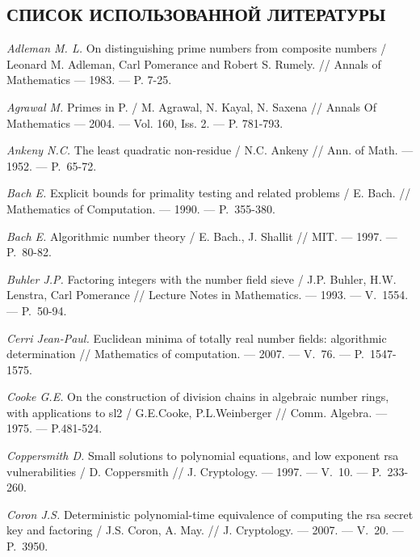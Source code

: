 \newpage
\begin{center}
    \section*{СПИСОК ИСПОЛЬЗОВАННОЙ ЛИТЕРАТУРЫ}
\end{center}

\begin{thebibliography}{99}
\vspace{-12pt}

    \textit{Adleman M. L.} On distinguishing prime numbers from composite numbers / Leonard M. Adleman, Carl Pomerance and Robert S. Rumely. // Annals of Mathematics — 1983. — P. 7-25.
    
    \textit{Agrawal M.} Primes in P. / M. Agrawal, N. Kayal, N. Saxena // Annals Of Mathematics — 2004. — Vol. 160, Iss. 2. — P. 781-793.
    
    \textit{Ankeny N.C.} The least quadratic non-residue / N.C. Ankeny // Ann. of Math. — 1952. — P.~65-72.

    \textit{Bach E.} Explicit bounds for primality testing and related problems / E. Bach. // Mathematics of Computation. — 1990. — P.~355-380.
    
    \textit{Bach E.} Algorithmic number theory / E. Bach., J. Shallit // MIT. — 1997. — P.~80-82.
    
    \textit{Buhler J.P.} Factoring integers with the number field sieve / J.P. Buhler, H.W. Lenstra, Carl Pomerance // Lecture Notes in Mathematics. — 1993. — V.~1554. — P.~50-94.

    \textit{Cerri Jean-Paul.} Euclidean minima of totally real number fields: algorithmic determination // Mathematics of computation. — 2007. — V.~76. — {P.}~1547-1575.

    \textit{Cooke G.E.} On the construction of division chains in algebraic number rings, with applications to sl2 / G.E.Cooke, P.L.Weinberger // Comm. Algebra. — 1975. — P.481-524.

    \textit{Coppersmith D.} Small solutions to polynomial equations, and low exponent rsa vulnerabilities / D. Coppersmith // J. Cryptology. — 1997. — V.~10. — P.~233-260.

    \textit{Coron J.S.} Deterministic polynomial-time equivalence of computing the rsa secret key and factoring / J.S. Coron, A. May. // J. Cryptology. — 2007. — V.~20. — P.~3950.


\end{thebibliography}
